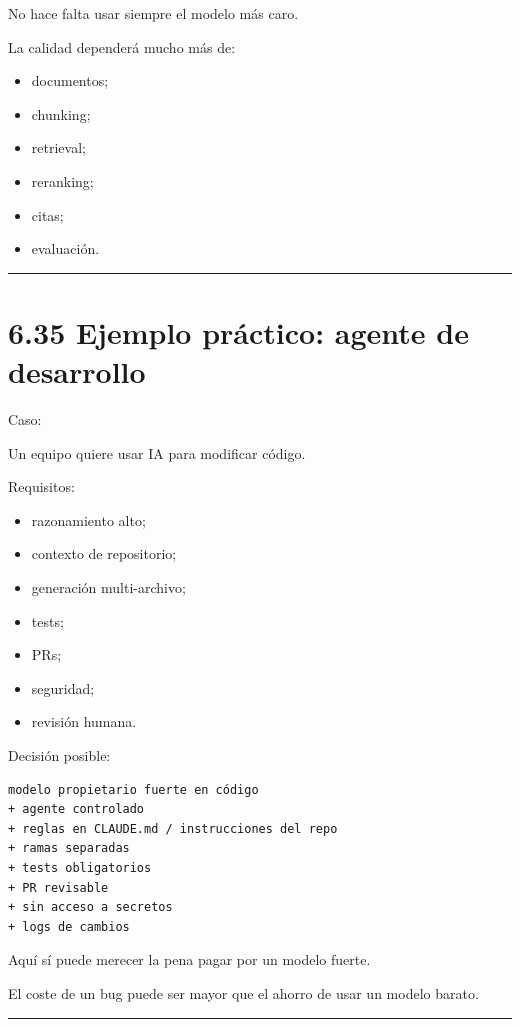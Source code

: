 No hace falta usar siempre el modelo más caro.

La calidad dependerá mucho más de:

\begin{itemize}
\tightlist
\item
  documentos;
\item
  chunking;
\item
  retrieval;
\item
  reranking;
\item
  citas;
\item
  evaluación.
\end{itemize}

\begin{center}\rule{0.5\linewidth}{0.5pt}\end{center}

\section{6.35 Ejemplo práctico: agente de
desarrollo}\label{ejemplo-pruxe1ctico-agente-de-desarrollo}

Caso:

Un equipo quiere usar IA para modificar código.

Requisitos:

\begin{itemize}
\tightlist
\item
  razonamiento alto;
\item
  contexto de repositorio;
\item
  generación multi-archivo;
\item
  tests;
\item
  PRs;
\item
  seguridad;
\item
  revisión humana.
\end{itemize}

Decisión posible:

\begin{lstlisting}
modelo propietario fuerte en código
+ agente controlado
+ reglas en CLAUDE.md / instrucciones del repo
+ ramas separadas
+ tests obligatorios
+ PR revisable
+ sin acceso a secretos
+ logs de cambios
\end{lstlisting}

Aquí sí puede merecer la pena pagar por un modelo fuerte.

El coste de un bug puede ser mayor que el ahorro de usar un modelo
barato.

\begin{center}\rule{0.5\linewidth}{0.5pt}\end{center}

